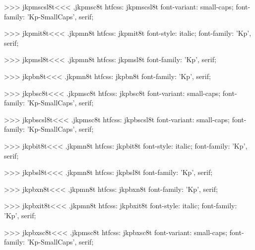 >>>
\<jkpmscsl8t\><<<
.jkpmsc8t
htfcss:  jkpmscsl8t  font-variant: small-caps; font-family: 'Kp-SmallCaps', serif;

>>>
\<jkpmit8t\><<<
.jkpmn8t
htfcss:  jkpmit8t  font-style: italic; font-family: 'Kp', serif;

>>>
\<jkpmsl8t\><<<
.jkpmn8t
htfcss:  jkpmsl8t  font-family: 'Kp', serif;

>>>
\<jkpbn8t\><<<
.jkpmn8t
htfcss:  jkpbn8t  font-family: 'Kp', serif;

>>>
\<jkpbsc8t\><<<
.jkpmsc8t
htfcss:  jkpbsc8t  font-variant: small-caps; font-family: 'Kp-SmallCaps', serif;

>>>
\<jkpbscsl8t\><<<
.jkpmsc8t
htfcss:  jkpbscsl8t  font-variant: small-caps; font-family: 'Kp-SmallCaps', serif;

>>>
\<jkpbit8t\><<<
.jkpmn8t
htfcss:  jkpbit8t  font-style: italic; font-family: 'Kp', serif;

>>>
\<jkpbsl8t\><<<
.jkpmn8t
htfcss:  jkpbsl8t  font-family: 'Kp', serif;

>>>
\<jkpbxn8t\><<<
.jkpmn8t
htfcss:  jkpbxn8t  font-family: 'Kp', serif;

>>>
\<jkpbxit8t\><<<
.jkpmn8t
htfcss:  jkpbxit8t  font-style: italic; font-family: 'Kp', serif;

>>>
\<jkpbxsc8t\><<<
.jkpmsc8t
htfcss:  jkpbxsc8t  font-variant: small-caps; font-family: 'Kp-SmallCaps', serif;

